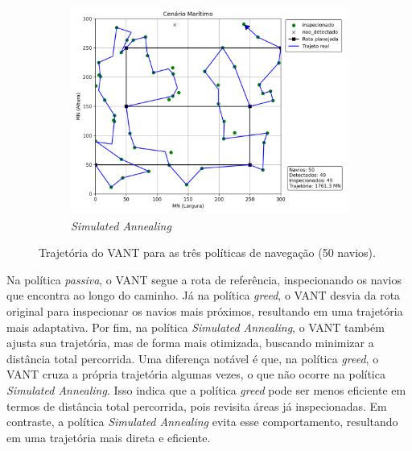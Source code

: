 \begin{figure}[H]
\begin{subfigure}{0.4\textwidth}
        \centering
        \includegraphics[width=\linewidth]{fig/SA.png}
        \caption{\textit{Simulated Annealing}}
        \label{fig:trajetoria_sa}
    \end{subfigure}
    \caption{Trajetória do VANT para as três políticas de navegação (50 navios).}
    \label{fig:trajetorias_comparacao}
\end{figure}

Na política \textit{passiva}, o VANT segue a rota de referência, inspecionando os navios que encontra ao longo do caminho. Já na política \textit{greed}, o VANT desvia da rota original para inspecionar os navios mais próximos, resultando em uma trajetória mais adaptativa. Por fim, na política \textit{Simulated Annealing}, o VANT também ajusta sua trajetória, mas de forma mais otimizada, buscando minimizar a distância total percorrida. Uma diferença notável é que, na política \textit{greed}, o VANT cruza a própria trajetória algumas vezes, o que não ocorre na política \textit{Simulated Annealing}. Isso indica que a política \textit{greed} pode ser menos eficiente em termos de distância total percorrida, pois revisita áreas já inspecionadas. Em contraste, a política \textit{Simulated Annealing} evita esse comportamento, resultando em uma trajetória mais direta e eficiente.



